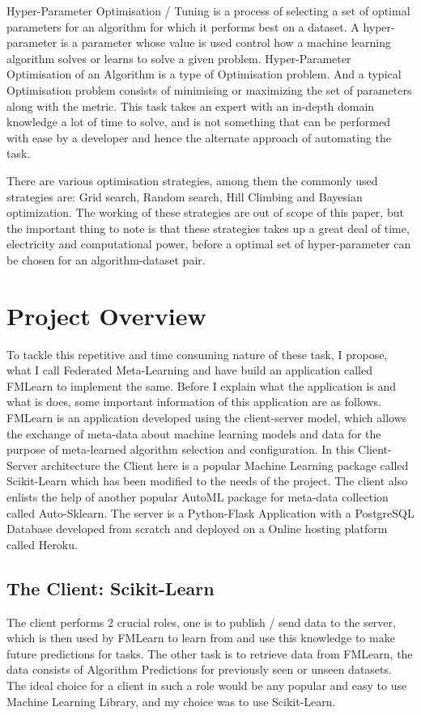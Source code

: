 Hyper-Parameter Optimisation / Tuning is a process of selecting a set of optimal parameters for an algorithm for which it performs best on a dataset. A hyper-parameter is a parameter whose value is used control how a machine learning algorithm solves or learns to solve a given problem. Hyper-Parameter Optimisation of an Algorithm is a type of Optimisation problem. And a typical Optimisation problem consists of minimising or maximizing the set of parameters along with the metric. This task takes an expert with an in-depth domain knowledge a lot of time to solve, and is not something that can be performed with ease by a developer and hence the alternate approach of automating the task.

There are various optimisation strategies, among them the commonly used strategies are: Grid search, Random search, Hill Climbing and Bayesian optimization. The working of these strategies are out of scope of this paper, but the important thing to note is that these strategies takes up a great deal of time, electricity and computational power, before a optimal set of hyper-parameter can be chosen for an algorithm-dataset pair.

\section{Project Overview}
To tackle this repetitive and time consuming nature of these task, I propose, what I call Federated Meta-Learning and have build an application called FMLearn to implement the same. Before I explain what the application is and what is does, some important information of this application are as follows. FMLearn is an application developed using the client-server model, which allows the exchange of meta-data about machine learning models and data for the purpose of meta-learned algorithm selection and configuration. In this Client-Server architecture the Client here is a popular Machine Learning package called Scikit-Learn which has been modified to the needs of the project. The client also enlists the help of another popular AutoML package for meta-data collection called Auto-Sklearn. The server is a Python-Flask Application with a PostgreSQL Database developed from scratch and deployed on a Online hosting platform called Heroku.

\subsection{The Client: Scikit-Learn}
The client performs 2 crucial roles, one is to publish / send data to the server, which is then used by FMLearn to learn from and use this knowledge to make future predictions for tasks. The other task is to retrieve data from FMLearn, the data consists of Algorithm Predictions for previously seen or unseen datasets. The ideal choice for a client in such a role would be any popular and easy to use Machine Learning Library, and my choice was to use Scikit-Learn.


